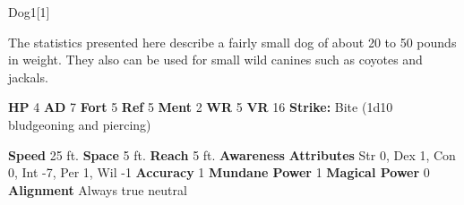   
  \begin{monsection}{Dog}{1}[1]
    \vspace{-1em}\vspace{-1em}
    \vspace{0em}

    
       The statistics presented here describe a fairly small dog of about 20 to 50 pounds in weight.
       They also can be used for small wild canines such as coyotes and jackals.
    
    

    \begin{spellcontent}
      \begin{spelltargetinginfo}
        \pari \textbf{HP} 4 \monsep
          \textbf{AD} 7 \monsep
          \textbf{Fort} 5 \monsep
          \textbf{Ref} 5 \monsep
          \textbf{Ment} 2
        \pari \textbf{WR} 5 \monsep
        \textbf{VR} 16
        \pari \textbf{Strike:}
            Bite  (1d10 bludgeoning and piercing)
      \end{spelltargetinginfo}
    \end{spellcontent}
    \begin{monsterfooter}
      \pari \textbf{Speed} 25 ft. \monsep
        \textbf{Space} 5 ft. \monsep
        \textbf{Reach} 5 ft.
      \pari \textbf{Awareness} 
      \pari \textbf{Attributes}
        Str 0, Dex 1,
        Con 0, Int -7,
        Per 1, Wil -1
      \pari \textbf{Accuracy} 1 \monsep
        \textbf{Mundane Power} 1 \monsep
      \textbf{Magical Power} 0
      \pari \textbf{Alignment} Always true neutral
    \end{monsterfooter}
  \end{monsection}
  
